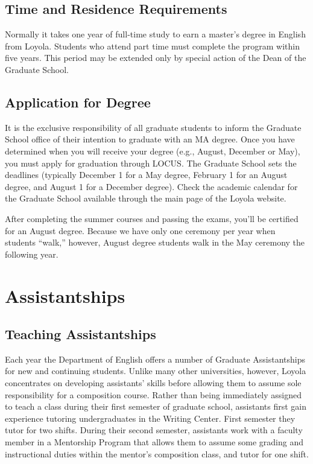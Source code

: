 \documentclass[letterpaper,10pt,english]{sphinxmanual}
\begin{document}
\section{Time and Residence Requirements}
\label{ms_programs:time-and-residence-requirements}
Normally it takes one year of full-time study to earn a master’s degree in English from Loyola. Students who attend part time must complete the program within five years. This period may be extended only by special action of the Dean of the Graduate School.


\section{Application for Degree}
\label{ms_programs:application-for-degree}
It is the exclusive responsibility of all graduate students to inform the Graduate School office of their intention to graduate with an MA degree. Once you have determined when you will receive your degree (e.g., August, December or May), you must apply for graduation through LOCUS. The Graduate School sets the deadlines (typically December 1 for a May degree, February 1 for an August degree, and August 1 for a December degree). Check the academic calendar for the Graduate School available through the main page of the Loyola website.

After completing the summer courses and passing the exams, you'll be certified for an August degree. Because we have only one ceremony per year when students ``walk,'' however, August degree students walk in the May ceremony the following year.


\chapter{Assistantships}
\label{assistantships::doc}\label{assistantships:assistantships}

\section{Teaching Assistantships}
\label{assistantships:teaching-assistantships}
Each year the Department of English offers a number of Graduate Assistantships for new and continuing students. Unlike many other universities, however, Loyola concentrates on developing assistants’ skills before allowing them to assume sole responsibility for a composition course. Rather than being immediately assigned to teach a class during their first semester of graduate school, assistants first gain experience tutoring undergraduates in the Writing Center. First semester they tutor for two shifts. During their second semester, assistants work with a faculty member in a Mentorship Program that allows them to assume some grading and instructional duties within the mentor’s composition class, and tutor for one shift.
\end{document}
